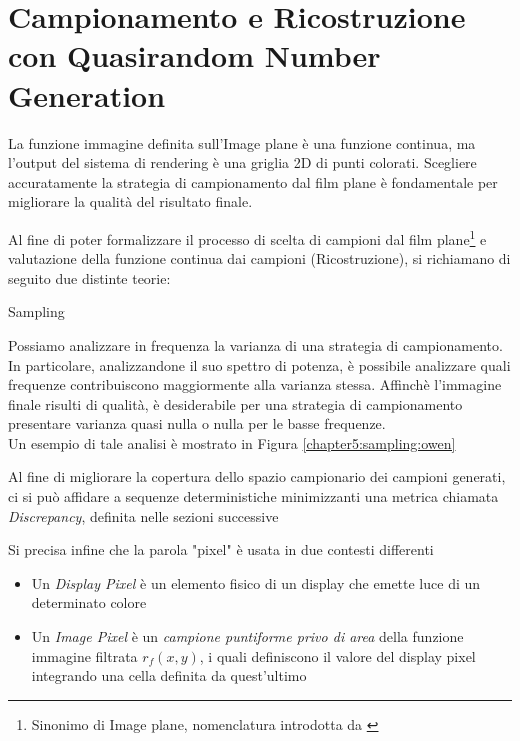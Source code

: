 \newcommand{\fourier}[1]{\ensuremath{\mathcal{F}\left\{#1\right\}}}
\newcommand{\ifourier}[1]{\ensuremath{\mathcal{F}^{-1}\left\{#1\right\}}}
\newcommand{\intwhole}{\ensuremath{\int_{-\infty}^{+\infty}}}
\newcommand{\sumwhole}[1]{\ensuremath{\sum_{#1=-\infty}^{+\infty}}}
\chapter{Campionamento e Ricostruzione con Quasirandom Number Generation}\label{chapter5}
La funzione immagine definita sull'Image plane \`e una funzione continua, ma l'output del sistema di rendering \`e una griglia 2D di punti colorati. 
Scegliere accuratamente la strategia di 
campionamento dal film plane \`e fondamentale per migliorare la qualit\`a del risultato finale.\par
Al fine di poter formalizzare il processo di scelta di campioni dal film plane\footnote{Sinonimo di Image plane, nomenclatura introdotta da 
\cite{pharr}} e valutazione della funzione continua dai campioni (Ricostruzione),
si richiamano di seguito due distinte teorie: 
\begin{altDescription}{Sampling}
	\item[Analisi di Fourier del Segnale] Possiamo analizzare in frequenza la varianza di una strategia di campionamento. In particolare, 
		analizzandone il suo spettro di potenza, \`e possibile analizzare quali frequenze contribuiscono maggiormente alla varianza stessa. Affinch\`e 
		l'immagine finale risulti di qualit\`a, \`e desiderabile per una strategia di campionamento presentare varianza quasi nulla o nulla per le 
		basse frequenze.\\ Un esempio di tale analisi \`e mostrato in Figura \ref{chapter5:sampling:owen}
	\item[Quasirandom Number Generation] Al fine di migliorare la copertura dello spazio campionario dei campioni generati, ci si pu\`o affidare 
		a sequenze deterministiche minimizzanti una metrica chiamata \textit{Discrepancy}, definita nelle sezioni successive
\end{altDescription}
Si precisa infine che la parola "pixel" \`e usata in due contesti differenti
\begin{itemize}[topsep=0pt,noitemsep]
	\item[] Un \textit{Display Pixel} \`e un elemento fisico di un display che emette luce di un determinato colore
	\item[] Un \textit{Image Pixel} \`e un \textit{campione puntiforme privo di area} della funzione immagine filtrata $r_f(x,y)$, i quali 
		definiscono il valore del display pixel integrando una cella definita da quest'ultimo
\end{itemize}
